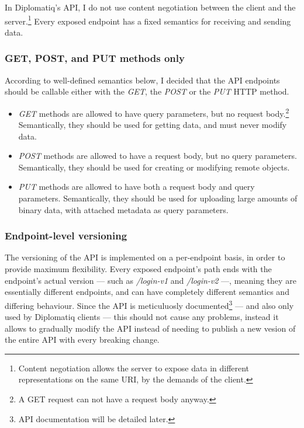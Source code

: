 In Diplomatiq's API, I do not use content negotiation between the client and the server.\footnote{Content negotiation allows the server to expose data in different representations on the same URI, by the demands of the client.} Every exposed endpoint has a fixed semantics for receiving and sending data.

\subsubsection{GET, POST, and PUT methods only}

According to well-defined semantics below, I decided that the API endpoints should be callable either with the \emph{GET}, the \emph{POST} or the \emph{PUT} HTTP method.

\begin{itemize}
\item \emph{GET} methods are allowed to have query parameters, but no request body.\footnote{A GET request can not have a request body anyway.} Semantically, they should be used for getting data, and must never modify data.
\item \emph{POST} methods are allowed to have a request body, but no query parameters. Semantically, they should be used for creating or modifying remote objects.
\item \emph{PUT} methods are allowed to have both a request body and query parameters. Semantically, they should be used for uploading large amounts of binary data, with attached metadata as query parameters.
\end{itemize}

\subsubsection{Endpoint-level versioning}

The versioning of the API is implemented on a per-endpoint basis, in order to provide maximum flexibility. Every exposed endpoint's path ends with the endpoint's actual version — such as \emph{/login-v1} and \emph{/login-v2} —, meaning they are essentially different endpoints, and can have completely different semantics and differing behaviour. Since the API is meticuluosly documented\footnote{API documentation will be detailed later.} — and also only used by Diplomatiq clients — this should not cause any problems, instead it allows to gradually modify the API instead of needing to publish a new vesion of the entire API with every breaking change.

